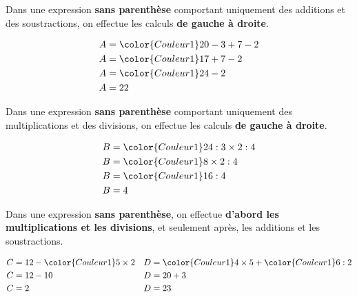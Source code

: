 \begin{minipage}[c]{0.48\textwidth}
\begin{Règle}

Dans une expression \textbf{sans parenthèse} comportant
uniquement des additions et des soustractions, on effectue les calculs \textbf{de gauche à droite}.
\end{Règle}

\begin{Exemple} 
\vspace{-0.5cm}
\begin{align*}
A & ={\color{Couleur1}20-3}+7-2\\
A & ={\color{Couleur1}17+7}-2\\
A & ={\color{Couleur1}24-2}\\
A & =22
\end{align*}

\end{Exemple}
\end{minipage} \hfill
\begin{minipage}[c]{0.48\textwidth}


\begin{Règle}
Dans une expression \textbf{sans parenthèse} comportant
uniquement des multiplications et des divisions, on effectue les calculs \textbf{de gauche à droite}.
\end{Règle}

\begin{Exemple} 
\vspace{-0.5cm}
\begin{align*}
B & ={\color{Couleur1}24:3}\times2:4\\
B & ={\color{Couleur1}8\times2}:4\\
B & ={\color{Couleur1}16:4}\\
B & =4
\end{align*}

\end{Exemple}

\end{minipage} 


\begin{Règle}
Dans une expression \textbf{sans parenthèse}, on
effectue \textbf{d'abord les multiplications et les divisions}, et
seulement après, les additions et les soustractions.
\end{Règle}


\begin{Exemples}
\begin{align*}
C & =12-{\color{Couleur1}5\times2} & D & ={\color{Couleur1}4\times5}+{\color{Couleur1}6:2}\\
C & =12-10 & D & =20+3\\
C & =2 & D & =23
\end{align*}
\end{Exemples}

